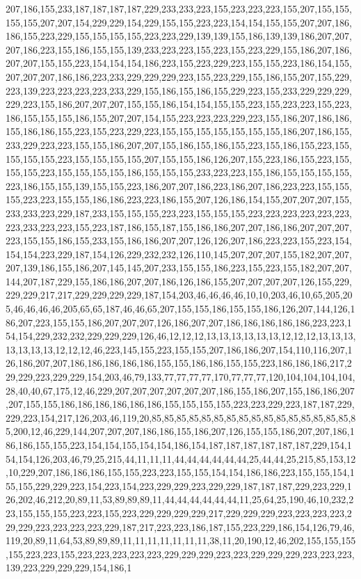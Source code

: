 207,186,155,233,187,187,187,187,229,233,233,223,155,223,223,223,155,207,155,155,155,155,207,207,154,229,229,154,229,155,155,223,223,154,154,155,155,207,207,186,186,155,223,229,155,155,155,155,223,223,229,139,139,155,186,139,139,186,207,207,207,186,223,155,186,155,155,139,233,223,223,155,223,155,223,229,155,186,207,186,207,207,155,155,223,154,154,154,186,223,155,223,229,223,155,155,223,186,154,155,207,207,207,186,186,223,233,229,229,229,223,155,223,229,155,186,155,207,155,229,223,139,223,223,223,223,233,229,155,186,155,186,155,229,223,155,233,229,229,229,229,223,155,186,207,207,207,155,155,186,154,154,155,155,223,155,223,223,155,223,186,155,155,155,186,155,207,207,154,155,223,223,223,229,223,155,186,207,186,186,155,186,186,155,223,155,223,229,223,155,155,155,155,155,155,155,186,207,186,155,233,229,223,223,155,155,186,207,207,155,186,155,186,155,223,155,186,155,223,155,155,155,155,223,155,155,155,155,207,155,155,186,126,207,155,223,186,155,223,155,155,155,223,155,155,155,155,186,155,155,155,233,223,223,155,186,155,155,155,155,223,186,155,155,139,155,155,223,186,207,207,186,223,186,207,186,223,223,155,155,155,223,223,155,155,186,186,223,223,186,155,207,126,186,154,155,207,207,207,155,233,233,223,229,187,233,155,155,155,223,223,155,155,155,223,223,223,223,223,223,223,233,223,223,155,223,187,186,155,187,155,186,186,207,207,186,186,207,207,207,223,155,155,186,155,233,155,186,186,207,207,126,126,207,186,223,223,155,223,154,154,154,223,229,187,154,126,229,232,232,126,110,145,207,207,207,155,182,207,207,207,139,186,155,186,207,145,145,207,233,155,155,186,223,155,223,155,182,207,207,144,207,187,229,155,186,186,207,207,186,126,186,155,207,207,207,207,126,155,229,229,229,217,217,229,229,229,229,187,154,203,46,46,46,46,10,10,203,46,10,65,205,205,46,46,46,46,205,65,65,187,46,46,65,207,155,155,186,155,155,186,126,207,144,126,186,207,223,155,155,186,207,207,207,126,186,207,207,186,186,186,186,186,223,223,154,154,229,232,232,229,229,229,126,46,12,12,12,13,13,13,13,13,13,12,12,12,13,13,13,13,13,13,13,12,12,12,46,223,145,155,223,155,155,207,186,186,207,154,110,116,207,126,186,207,207,186,186,186,186,186,155,155,186,186,155,155,223,186,186,186,217,229,229,223,229,229,154,203,46,79,133,77,77,77,77,170,77,77,77,120,104,104,104,104,28,40,40,67,175,12,46,229,207,207,207,207,207,207,186,155,186,207,155,186,186,207,207,155,155,186,186,186,186,186,186,155,155,155,155,223,223,229,223,187,187,229,229,223,154,217,126,203,46,119,20,85,85,85,85,85,85,85,85,85,85,85,85,85,85,85,85,85,200,12,46,229,144,207,207,207,186,186,155,186,207,126,155,155,186,207,207,186,186,186,155,155,223,154,154,155,154,154,186,154,187,187,187,187,187,187,229,154,154,154,126,203,46,79,25,215,44,11,11,11,44,44,44,44,44,44,25,44,44,25,215,85,153,12,10,229,207,186,186,186,155,155,223,223,155,155,154,154,186,186,223,155,155,154,155,155,229,229,223,154,223,154,223,229,229,223,229,229,187,187,187,229,223,229,126,202,46,212,20,89,11,53,89,89,89,11,44,44,44,44,44,44,11,25,64,25,190,46,10,232,223,155,155,155,223,223,155,223,229,229,229,229,217,229,229,229,223,223,223,223,229,229,223,223,223,223,229,187,217,223,223,186,187,155,223,229,186,154,126,79,46,119,20,89,11,64,53,89,89,89,11,11,11,11,11,11,11,38,11,20,190,12,46,202,155,155,155,155,223,223,155,223,223,223,223,223,229,229,229,223,223,229,229,229,223,223,223,139,223,229,229,229,154,186,1